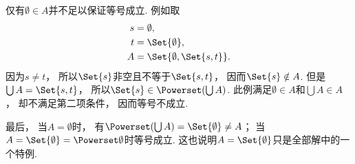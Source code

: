 \begin{example}
\begin{solution}
        仅有\(\emptyset\in A\)并不足以保证等号成立.
        例如取
        \begin{align*}
            s &= \emptyset, \\
            t &= \Set{\emptyset}, \\
            A &= \Set{\emptyset,\Set{s,t}}.
        \end{align*}
        因为\(s\neq t\)，
        所以\(\Set{s}\)非空且不等于\(\Set{s,t}\)，
        因而\(\Set{s}\notin A\).
        但是\(\bigcup A=\Set{s,t}\)，
        所以\(\Set{s}\in\Powerset(\bigcup A)\).
        此例满足\(\emptyset\in A\)和\(\bigcup A\in A\)，
        却不满足第二项条件，
        因而等号不成立.

        最后，
        当\(A=\emptyset\)时，
        有\(\Powerset(\bigcup A)=\Set{\emptyset}\neq A\)；
        当\(A=\Set{\emptyset}=\Powerset\emptyset\)时等号成立.
        这也说明\(A=\Set{\emptyset}\)只是全部解中的一个特例.
    \end{solution}
\end{example}
